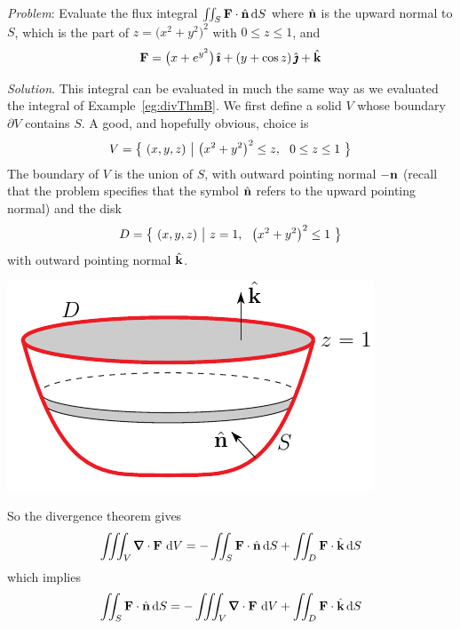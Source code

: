 \begin{eg}\label{eg:divThmC}
\noindent\textit{Problem}:
Evaluate the flux integral $\iint_S \mathbf{F}\cdot\hat{\mathbf{n}}\,\mathrm{d}S$ where
$\hat{\mathbf{n}} $ is the upward normal to $S$, which is the part of 
$z={\big(x^2+y^2\big)}^2$ with $0\le z\le 1$, and
\begin{equation*}
\mathbf{F} = \big(x+e^{y^2}\big)\,\hat{\pmb{\imath}} + (y+\cos z)\,\hat{\pmb{\jmath}} + \hat{\mathbf{k}}
\end{equation*}

\medskip
\noindent\textit{Solution}.
This integral can be evaluated in much the same way as we evaluated 
the integral of Example~\ref{eg:divThmB}. We first define a solid $V$ 
whose boundary $\partial V$ contains $S$. A good, and hopefully obvious, 
choice is
\begin{align*}
V = \big\{ \ (x,y,z)\ \big|\ {\big(x^2+y^2\big)}^2\le z,\ \ 0\le z\le 1 \ \big\}
\end{align*}
The boundary of $V$ is the union of $S$, with outward pointing normal $-\mathbf{n}$
(recall that the problem specifies that the symbol $\hat{\mathbf{n}}$ refers to
the upward pointing normal)  and the disk
\begin{equation*}
D = \Set{(x,y,z)}{z= 1,\ \  {\big(x^2+y^2\big)}^2\le 1}
\end{equation*}
with outward pointing normal $\hat{\mathbf{k}}$.
\begin{nfig}
\begin{center}
    \includegraphics{bowl.pdf}
\end{center}
\end{nfig}
So the divergence theorem gives
\begin{align*}
\tripInt_V\vnabla\cdot\vF\ \dee{V} 
= -\dblInt_S \vF\cdot\hn\,\dee{S}
 +\dblInt_{D} \vF\cdot\hk\,\dee{S}
\end{align*}
which implies
\begin{align*}
\dblInt_S \vF\cdot\hn\,\dee{S}
&= -\tripInt_V\vnabla\cdot\vF\ \dee{V} 
  +\dblInt_{D} \vF\cdot\hk\,\dee{S} \\

\end{align*}
\end{eg}

